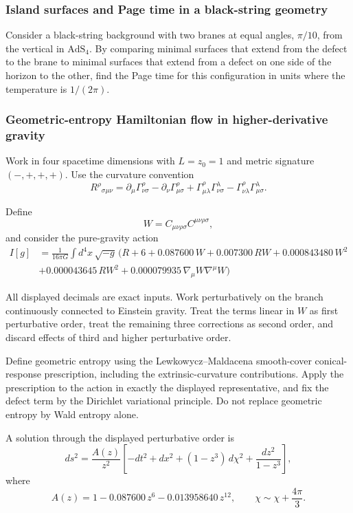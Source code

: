 \subsubsection{Island surfaces and Page time in a black-string geometry}
\label{problem:black-string-page-time}
Consider a black-string background with two branes at equal angles, $\pi/10$, from the vertical in $\mathrm{AdS}_4$. By comparing minimal surfaces that extend from the defect to the brane to minimal surfaces that extend from a defect on one side of the horizon to the other, find the Page time for this configuration in units where the temperature is $1/(2\pi)$.

\subsubsection{Geometric-entropy Hamiltonian flow in higher-derivative gravity}
\label{problem:geometric-entropy-flow}
Work in four spacetime dimensions with \(L=z_0=1\) and metric signature
\((-,+,+,+)\). Use the curvature convention
\[
R^\rho{}_{\sigma\mu\nu}
=
\partial_\mu \Gamma^\rho_{\nu\sigma}
-
\partial_\nu \Gamma^\rho_{\mu\sigma}
+
\Gamma^\rho_{\mu\lambda}\Gamma^\lambda_{\nu\sigma}
-
\Gamma^\rho_{\nu\lambda}\Gamma^\lambda_{\mu\sigma}.
\]

Define
\[
W=C_{\mu\nu\rho\sigma}C^{\mu\nu\rho\sigma},
\]
and consider the pure-gravity action
\[
\begin{split}
  I[g] &= \frac{1}{16\pi G}
\int d^4x\,\sqrt{-g}\,
(
R+6
+0.087600\,W
+0.007300\,R W
+0.000843480\,W^2 \\
&+0.000043645\,R W^2
+0.000079935\,\nabla_\mu W\nabla^\mu W
)
\end{split}  
\]

All displayed decimals are exact inputs. Work perturbatively on the branch
continuously connected to Einstein gravity. Treat the terms linear in \(W\) as
first perturbative order, treat the remaining three corrections as second
order, and discard effects of third and higher perturbative order.

Define geometric entropy using the Lewkowycz--Maldacena smooth-cover
conical-response prescription, including the extrinsic-curvature
contributions. Apply the prescription to the action in exactly the displayed
representative, and fix the defect term by the Dirichlet variational
principle. Do not replace geometric entropy by Wald entropy alone.

A solution through the displayed perturbative order is
\[
ds^2
=
\frac{A(z)}{z^2}
\left[
-dt^2+dx^2+(1-z^3)\,d\chi^2
+\frac{dz^2}{1-z^3}
\right],
\]
where
\[
A(z)
=
1-0.087600\,z^6-0.013958640\,z^{12},
\qquad
\chi\sim\chi+\frac{4\pi}{3}.
\]

